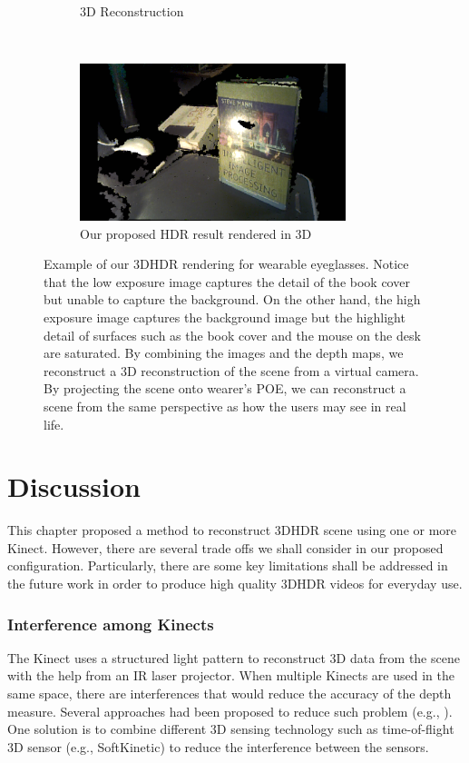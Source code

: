 \begin{figure}[t!]
\begin{subfigure}{0.4\textwidth}
        \caption{3D Reconstruction}
        \label{hdr_result1}
    \end{subfigure}
    ~
    \begin{subfigure}{0.55\textwidth}
	\centering	
	\includegraphics[height=1.8in]{ch4/diagrams/hdr_results/hdr.jpg}
	\caption{Our proposed HDR result rendered in 3D}
	\label{hdr_result2}
    \end{subfigure}
    
    \caption{Example of our 3DHDR rendering for wearable eyeglasses. Notice that the low exposure image captures the detail of the book cover but unable to capture the background. On the other hand, the high exposure image captures the background image but the highlight detail of surfaces such as the book cover and the mouse on the desk are saturated. By combining the images and the depth maps, we reconstruct a 3D reconstruction of the scene from a virtual camera. By projecting the scene onto wearer's POE, we can reconstruct a scene from the same perspective as how the users may see in real life.}
\label{fig_3D_HDR_results}
\end{figure}

\section{Discussion}
\label{sec_discussion}
This chapter proposed a method to reconstruct 3DHDR scene using one or more Kinect. However, there are several trade offs we shall consider in our proposed configuration. Particularly, there are some key limitations shall be addressed in the future work in order to produce high quality 3DHDR videos for everyday use.

\subsubsection{Interference among Kinects}
The Kinect uses a structured light pattern to reconstruct 3D data from the scene with the help from an IR laser projector. When multiple Kinects are used in the same space, there are interferences that would reduce the accuracy of the depth measure. Several approaches had been proposed to reduce such problem (e.g., \cite{maimone2012reducing}). One solution is to combine different 3D sensing technology such as time-of-flight 3D sensor (e.g., SoftKinetic) to reduce the interference between the sensors. 

